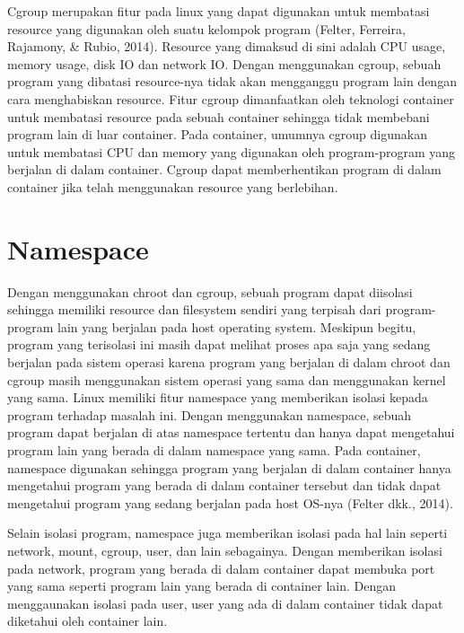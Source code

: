 \par Cgroup merupakan fitur pada linux yang dapat digunakan untuk membatasi resource yang digunakan oleh suatu kelompok program (Felter, Ferreira, Rajamony, \& Rubio, 2014). Resource yang dimaksud di sini adalah CPU usage, memory usage, disk IO dan network IO. Dengan menggunakan cgroup, sebuah program yang dibatasi resource-nya tidak akan mengganggu program lain dengan cara menghabiskan resource. Fitur cgroup dimanfaatkan oleh teknologi container untuk membatasi resource pada sebuah container sehingga tidak membebani program lain di luar container. Pada container, umumnya cgroup digunakan untuk membatasi CPU dan memory yang digunakan oleh program-program yang berjalan di dalam container. Cgroup dapat memberhentikan program di dalam container jika telah menggunakan resource yang berlebihan.

\section{Namespace}

\par Dengan menggunakan chroot dan cgroup, sebuah program dapat diisolasi sehingga memiliki resource dan filesystem sendiri yang terpisah dari program-program lain yang berjalan pada host operating system. Meskipun begitu, program yang terisolasi ini masih dapat melihat proses apa saja yang sedang berjalan pada sistem operasi karena program yang berjalan di dalam chroot dan cgroup masih menggunakan sistem operasi yang sama dan menggunakan kernel yang sama. Linux memiliki fitur namespace yang memberikan isolasi kepada program terhadap masalah ini. Dengan menggunakan namespace, sebuah program dapat berjalan di atas namespace tertentu dan hanya dapat mengetahui program lain yang berada di dalam namespace yang sama. Pada container, namespace digunakan sehingga program yang berjalan di dalam container hanya mengetahui program yang berada di dalam container tersebut dan tidak dapat mengetahui program yang sedang berjalan pada host OS-nya (Felter dkk., 2014).

\par Selain isolasi program, namespace juga memberikan isolasi pada hal lain seperti network, mount, cgroup, user, dan lain sebagainya. Dengan memberikan isolasi pada network, program yang berada di dalam container dapat membuka port yang sama seperti program lain yang berada di container lain. Dengan menggaunakan isolasi pada user, user yang ada di dalam container tidak dapat diketahui oleh container lain.

